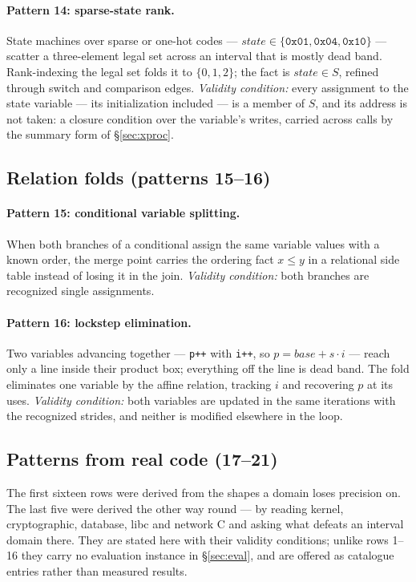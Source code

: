\documentclass[11pt,a4paper]{article}
\begin{document}
\paragraph{Pattern 14: sparse-state rank.} State machines over sparse or one-hot codes
--- $\mathit{state} \in \{\mathtt{0x01}, \mathtt{0x04}, \mathtt{0x10}\}$ --- scatter a
three-element legal set across an interval that is mostly dead band. Rank-indexing the
legal set folds it to $\{0, 1, 2\}$; the fact is $\mathit{state} \in S$, refined through
switch and comparison edges. \emph{Validity condition:} every assignment to the state
variable --- its initialization included --- is a member of $S$, and its address is not
taken: a closure condition over the variable's writes, carried across calls by the
summary form of \S\ref{sec:xproc}.

\subsection{Relation folds (patterns 15--16)}

\paragraph{Pattern 15: conditional variable splitting.} When both branches of a
conditional assign the same variable values with a known order, the merge point carries
the ordering fact $x \le y$ in a relational side table instead of losing it in the join.
\emph{Validity condition:} both branches are recognized single assignments.

\paragraph{Pattern 16: lockstep elimination.} Two variables advancing together ---
\texttt{p++} with \texttt{i++}, so $p = \mathit{base} + s \cdot i$ --- reach only a line
inside their product box; everything off the line is dead band. The fold eliminates one
variable by the affine relation, tracking $i$ and recovering $p$ at its uses.
\emph{Validity condition:} both variables are updated in the same iterations with the
recognized strides, and neither is modified elsewhere in the loop.

\subsection{Patterns from real code (17--21)}
\label{sec:corpus-patterns}

The first sixteen rows were derived from the shapes a domain loses precision on. The last
five were derived the other way round --- by reading kernel, cryptographic, database,
libc and network C and asking what defeats an interval domain there. They are stated here
with their validity conditions; unlike rows 1--16 they carry no evaluation instance in
\S\ref{sec:eval}, and are offered as catalogue entries rather than measured results.
\end{document}

